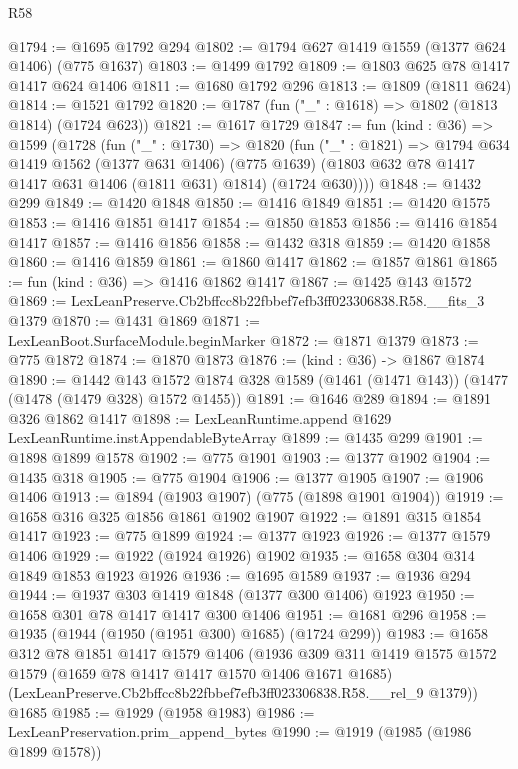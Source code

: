 \begin{lexlean}{R58}
\begin{coremodule}
{{@1794 := @1695 @1792 @294
@1802 := @1794 @627 @1419 @1559 (@1377 @624 @1406) (@775 @1637)
@1803 := @1499 @1792
@1809 := @1803 @625 @78 @1417 @1417 @624 @1406
@1811 := @1680 @1792 @296
@1813 := @1809 (@1811 @624)
@1814 := @1521 @1792
@1820 := @1787 (fun ("_" : @1618) => @1802 (@1813 @1814) (@1724 @623))
@1821 := @1617 @1729
@1847 := fun (kind : @36) =>
  @1599
    (@1728
      (fun ("_" : @1730) =>
      @1820
        (fun ("_" : @1821) =>
        @1794
          @634
          @1419
          @1562
          (@1377 @631 @1406)
          (@775 @1639)
          (@1803 @632 @78 @1417 @1417 @631 @1406 (@1811 @631) @1814)
          (@1724 @630))))
@1848 := @1432 @299
@1849 := @1420 @1848
@1850 := @1416 @1849
@1851 := @1420 @1575
@1853 := @1416 @1851 @1417
@1854 := @1850 @1853
@1856 := @1416 @1854 @1417
@1857 := @1416 @1856
@1858 := @1432 @318
@1859 := @1420 @1858
@1860 := @1416 @1859
@1861 := @1860 @1417
@1862 := @1857 @1861
@1865 := fun (kind : @36) => @1416 @1862 @1417
@1867 := @1425 @143 @1572
@1869 := LexLeanPreserve.Cb2bffcc8b22fbbef7efb3ff023306838.R58.__fits_3 @1379
@1870 := @1431 @1869
@1871 := LexLeanBoot.SurfaceModule.beginMarker
@1872 := @1871 @1379
@1873 := @775 @1872
@1874 := @1870 @1873
@1876 := (kind : @36) -> @1867 @1874
@1890 := @1442
    @143
    @1572
    @1874
    @328
    @1589
    (@1461 (@1471 @143))
    (@1477 (@1478 (@1479 @328) @1572 @1455))
@1891 := @1646 @289
@1894 := @1891 @326 @1862 @1417
@1898 := LexLeanRuntime.append @1629 LexLeanRuntime.instAppendableByteArray
@1899 := @1435 @299
@1901 := @1898 @1899 @1578
@1902 := @775 @1901
@1903 := @1377 @1902
@1904 := @1435 @318
@1905 := @775 @1904
@1906 := @1377 @1905
@1907 := @1906 @1406
@1913 := @1894 (@1903 @1907) (@775 (@1898 @1901 @1904))
@1919 := @1658 @316 @325 @1856 @1861 @1902 @1907
@1922 := @1891 @315 @1854 @1417
@1923 := @775 @1899
@1924 := @1377 @1923
@1926 := @1377 @1579 @1406
@1929 := @1922 (@1924 @1926) @1902
@1935 := @1658 @304 @314 @1849 @1853 @1923 @1926
@1936 := @1695 @1589
@1937 := @1936 @294
@1944 := @1937 @303 @1419 @1848 (@1377 @300 @1406) @1923
@1950 := @1658 @301 @78 @1417 @1417 @300 @1406
@1951 := @1681 @296
@1958 := @1935 (@1944 (@1950 (@1951 @300) @1685) (@1724 @299))
@1983 := @1658
    @312
    @78
    @1851
    @1417
    @1579
    @1406
    (@1936
      @309
      @311
      @1419
      @1575
      @1572
      @1579
      (@1659 @78 @1417 @1417 @1570 @1406 @1671 @1685)
      (LexLeanPreserve.Cb2bffcc8b22fbbef7efb3ff023306838.R58.__rel_9 @1379))
    @1685
@1985 := @1929 (@1958 @1983)
@1986 := LexLeanPreservation.prim_append_bytes
@1990 := @1919 (@1985 (@1986 @1899 @1578))
}}
\end{coremodule}
\end{lexlean}
